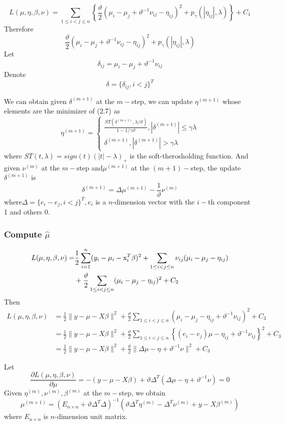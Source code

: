 \documentclass[cjk,10pt]{beamer}
\begin{document}
\begin{CJK*}{GBK}{song}
\begin{frame}
$$L(\mu,\eta,\beta,\nu)=\sum_{1\le i<j\le n}\left\{\frac{\vartheta}{2}(\mu_i-\mu_j+\vartheta^{-1}\nu_{ij}-\eta_{ij})^2+p_{\gamma}(|\eta_{ij}|,\lambda)\right\}+C_1$$
Therefore
$$\frac{\vartheta}{2}(\mu_i-\mu_j+\vartheta^{-1}\nu_{ij}-\eta_{ij})^2+p_{\gamma}(|\eta_{ij}|,\lambda)$$
Let
$$\delta_{ij}=\mu_i-\mu_j+\vartheta^{-1}\nu_{ij}$$
Denote
$$\delta = \{\delta_{ij},i<j\}^T$$
\end{frame}
\begin{frame}
We can obtain given $\delta^{(m+1)}$ at the $m-$step, we can update $\eta^{(m+1)}$ whose elements are the minimizer of (2.7) as
$$\eta^{(m+1)}=\begin{cases}\frac{ST(\delta^{(m+1)},\lambda/\vartheta)}{1-1/\gamma\vartheta},|\delta^{(m+1)}|\le \gamma\lambda\\ \delta^{(m+1)}, |\delta^{(m+1)}|>\gamma\lambda\end{cases}$$
where $ST(t,\lambda)=sign(t)(|t|-\lambda)_+$ is the soft-therosholding function. And given $\nu^{(m)}$ at the $m-$step and$\mu^{(m+1)}$ at the $(m+1)-$step, the update $\delta^{(m+1)}$ is $$\delta^{(m+1)}=\Delta\mu^{(m+1)}-\frac{1}{\vartheta}\nu^{(m)}$$
where$\Delta=\{e_i-e_j,i<j\}^T, e_i$ is a $n$-dimension vector with the $i-$th component 1 and others 0.
\end{frame}
\begin{frame}
\frametitle{Compute $\hat{\mu}$}

\begin{align*}L(\mu,\eta,\beta,\nu)=&\frac{1}{2}\sum_{i=1}^n(y_i-\mu_i-{\rm x}_i^T\beta)^2+\sum_{1\le i<j\le n}\nu_{ij}(\mu_i-\mu_j-\eta_{ij})\\
&+\frac{\vartheta}{2}\sum_{1\le i<j\le n}(\mu_i-\mu_j-\eta_{ij})^2+C_2\end{align*}
Then
$$\begin{aligned} L(\mu,\eta,\beta,\nu)&=\frac{1}{2}\|y-\mu-X\beta\|^2+\frac{\vartheta}{2}\sum_{1\le i<j\le n}(\mu_i-\mu_j-\eta_{ij}+\vartheta^{-1}\nu_{ij})^2+C_3\\
&=\frac{1}{2}\|y-\mu-X\beta\|^2+\frac{\vartheta}{2}\sum_{1\le i<j\le n}\left\{(e_i-e_j)\mu-\eta_{ij}+\vartheta^{-1}\nu_{ij}\right\}^2+C_3\\
&=\frac{1}{2}\|y-\mu-X\beta\|^2+\frac{\vartheta}{2}\|\Delta\mu-\eta+\vartheta^{-1}\nu\|^2+C_3
\end{aligned}$$
\end{frame}
\begin{frame}
Let
$$\frac{\partial L(\mu,\eta,\beta,\nu)}{\partial \mu}=-(y-\mu-X\beta)+\vartheta\Delta^T(\Delta\mu-\eta+\vartheta^{-1}\nu)=0$$
Given $\eta^{(m)},\nu^{(m)},\beta^{(m)}$ at the $m-$step, we obtain
$$\mu^{(m+1)}=(E_{n\times n}+\vartheta\Delta^T\Delta)^{-1}(\vartheta\Delta^T\eta^{(m)}-\Delta^T\nu^{(m)}+y-X\beta^{(m)})$$
where $E_{n\times n}$ is $n$-dimension unit matrix.
\end{frame}


\end{CJK*}
\end{document}
